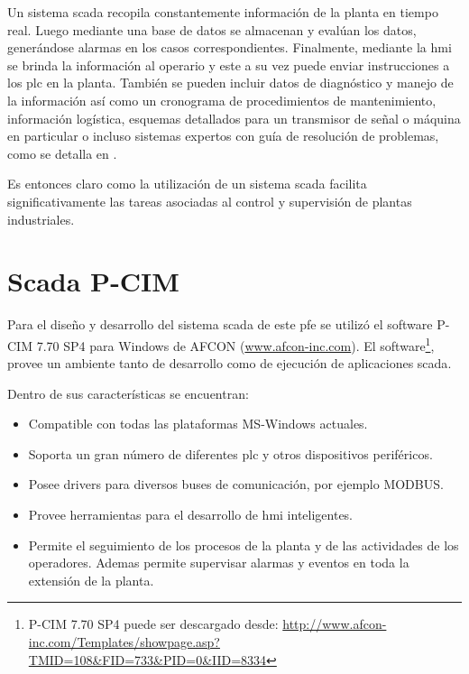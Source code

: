 Un sistema \gls{scada} recopila constantemente información de la planta en 
tiempo real. Luego mediante una base de datos se almacenan y evalúan los datos, 
generándose alarmas en los casos correspondientes. Finalmente, mediante
la \gls{hmi} se brinda la información al operario y este a su vez puede enviar
instrucciones a los \gls{plc} en la planta. También se pueden incluir datos de 
diagnóstico y manejo de la información así como un cronograma de procedimientos 
de mantenimiento, información logística, esquemas detallados para un transmisor de señal o 
máquina en particular o incluso sistemas expertos con guía de resolución de 
problemas, como se detalla en \cite{bib:ManualScada}.

Es entonces claro como la utilización de un sistema \gls{scada} facilita 
significativamente las tareas asociadas al control y supervisión de plantas
industriales.

\section{Scada P-CIM}
\label{sec:ScadaPCIM} 
Para el diseño y desarrollo del sistema \gls{scada} de este \gls{pfe} se 
utilizó el software P-CIM 7.70 SP4 para Windows de AFCON 
(\url{www.afcon-inc.com}). El software\footnote{P-CIM 7.70 SP4 puede
ser descargado desde:
\url{
http://www.afcon-inc.com/Templates/showpage.asp?TMID=108&FID=733&PID=0&IID=8334}
}, provee un ambiente tanto de desarrollo
como de ejecución de aplicaciones \gls{scada}.

Dentro de sus características se encuentran:
\begin{itemize}
 \item Compatible con todas las plataformas MS-Windows actuales.
 \item Soporta un gran número de diferentes \gls{plc} y otros dispositivos 
  periféricos.
 \item Posee drivers para diversos buses de comunicación, por ejemplo MODBUS.
 \item Provee herramientas para el desarrollo de \gls{hmi} inteligentes.
 \item Permite el seguimiento de los procesos de la planta y de las actividades
  de los operadores. Ademas permite supervisar alarmas y eventos en toda la
  extensión de la planta.
\end{itemize}

